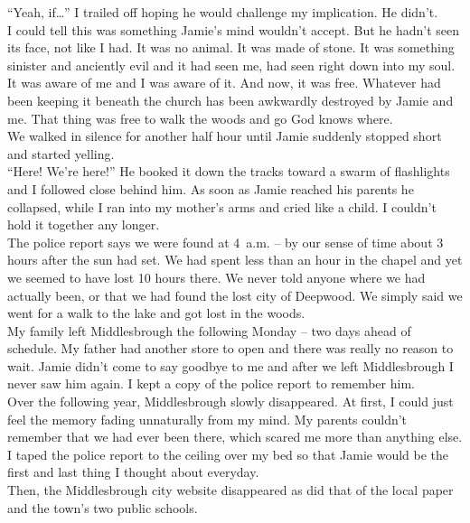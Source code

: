 \documentclass[a5paper]{scrartcl}
\begin{document}
\enquote{Yeah, if\dots} I trailed off hoping he would challenge my implication. He didn't.\\


I could tell this was something Jamie's mind wouldn't accept. But he hadn't seen its face, not like I had. It was no animal. It was made of stone. It was something sinister and anciently evil and it had seen me, had seen right down into my soul. It was aware of me and I was aware of it. And now, it was free. Whatever had been keeping it beneath the church has been awkwardly destroyed by Jamie and me. That thing was free to walk the woods and go God knows where. \\


We walked in silence for another half hour until Jamie suddenly stopped short and started yelling.\\


\enquote{Here! We're here!} He booked it down the tracks toward a swarm of flashlights and I followed close behind him. As soon as Jamie reached his parents he collapsed, while I ran into my mother's arms and cried like a child. I couldn't hold it together any longer.\\


The police report says we were found at 4~a.m. – by our sense of time about 3 hours after the sun had set. We had spent less than an hour in the chapel and yet we seemed to have lost 10 hours there. We never told anyone where we had actually been, or that we had found the lost city of Deepwood. We simply said we went for a walk to the lake and got lost in the woods. \\


My family left Middlesbrough the following Monday – two days ahead of schedule. My father had another store to open and there was really no reason to wait. Jamie didn't come to say goodbye to me and after we left Middlesbrough I never saw him again. I kept a copy of the police report to remember him.\\


Over the following year, Middlesbrough slowly disappeared. At first, I could just feel the memory fading unnaturally from my mind. My parents couldn't remember that we had ever been there, which scared me more than anything else. I taped the police report to the ceiling over my bed so that Jamie would be the first and last thing I thought about everyday.  \\


Then, the Middlesbrough city website disappeared as did that of the local paper and the town's two public schools.\\
\end{document}
